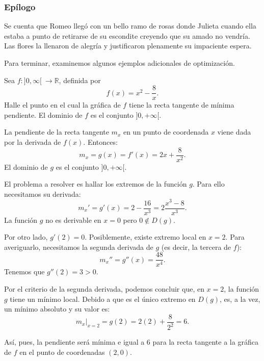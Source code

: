 \subsubsection{Epílogo}
Se cuenta que Romeo llegó con un bello ramo de rosas donde Julieta cuando ella estaba a punto de
retirarse de su escondite creyendo que su amado no vendría. Las flores la llenaron de alegría y
justificaron plenamente su impaciente espera.

Para terminar, examinemos algunos ejemplos adicionales de optimización.

\begin{exemplo}[Solución]{%
Sea $f\colon ]0, \infty[\ \to \mathbb{R} $, definida por
\[
f(x) = x^2-\frac{8}{x}.
\]
Halle el punto en el cual la gráfica de $f$ tiene la recta tangente de mínima pendiente.
}%
El dominio de $f$ es el conjunto $]0,+\infty[$.

La pendiente de la recta tangente $m_x$ en un punto de coordenada $x$ viene dada por la derivada de
$f(x)$. Entonces:
\begin{equation*}
    m_x = g(x) = f'(x) = 2x + \frac{8}{x^2}.
\end{equation*}
El dominio de $g$ es el conjunto $]0,+\infty[$.

El problema a resolver es hallar los extremos de la función $g$. Para ello necesitamos su derivada:
\begin{equation*}
    m_x' = g'(x) =2 - \frac{16}{x^3}= 2\frac{x^3-8}{x^3}.
\end{equation*}
La función $g$ no es derivable en $x=0$ pero $0\notin D(g)$.

Por otro lado, $g'(2)=0$. Posiblemente, existe extremo local en $x=2$. Para averiguarlo,
necesitamos la segunda derivada de $g$ (es decir, la tercera de $f$):
\begin{equation*}
    m_x'' = g''(x) = \frac{48}{x^4}.
\end{equation*}
Tenemos que $g''(2)= 3>0$.

Por el criterio de la segunda derivada, podemos concluir que, en $x=2$, la función $g$ tiene un
mínimo local. Debido a que es el único extremo en $D(g)$, es, a la vez, un mínimo absoluto y su
valor es:
\begin{equation*}
    m_x\Big |_{x=2}= g(2) = 2(2) + \frac{8}{2^2}= 6.
\end{equation*}

Así, pues, la pendiente será mínima e igual a 6 para la recta tangente a la gráfica de $f$ en el
punto de coordenadas $(2,0)$.


\end{exemplo}
